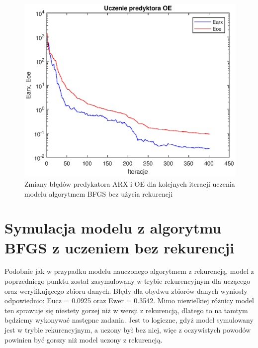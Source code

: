 		\begin{figure}[h!]
			\centering
			\includegraphics[width=\linewidth]{img/BFGS_ARX_p.eps}
			\caption{Zmiany błędów predykatora ARX i OE dla kolejnych iteracji uczenia modelu algorytmem BFGS bez użycia rekurencji}
			\label{fig:bfgs_arx_p}
		\end{figure}
		
		\newpage
	\section{Symulacja modelu z algorytmu BFGS z uczeniem bez rekurencji}
		\label{sec:bfgs_arx_sym}
		Podobnie jak w przypadku modelu nauczonego algorytmem z rekurencją, model z poprzedniego punktu został zasymulowany w trybie rekurencyjnym dla uczącego oraz weryfikującego zbioru danych. Błędy dla obydwu zbiorów danych wyniosły odpowiednio: Eucz = 0.0925 oraz Ewer = 0.3542. Mimo niewielkiej różnicy model ten sprawuje się niestety gorzej niż w wersji z rekurencją, dlatego to na tamtym będziemy wykonywać następne zadania. Jest to logiczne, gdyż model symulowany jest w trybie rekurencyjnym, a uczony był bez niej, więc z oczywistych powodów powinien być gorszy niż model uczony z rekurencją.
		
